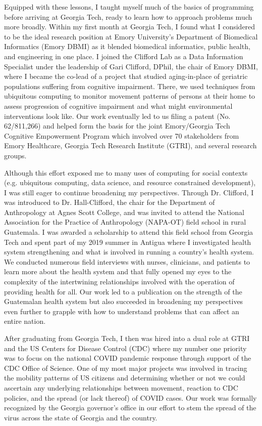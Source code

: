 \documentclass[11pt]{extarticle}
\begin{document}
Equipped with these lessons, I taught myself much of the basics of programming before arriving at Georgia Tech, ready to learn how to approach problems much more broadly.
Within my first month at Georgia Tech, I found what I considered to be the ideal research position at Emory University's Department of Biomedical Informatics (Emory DBMI) as it blended biomedical informatics, public health, and engineering in one place.
I joined the Clifford Lab as a Data Information Specialist under the leadership of Gari Clifford, DPhil, the chair of Emory DBMI,  where I became the co-lead of a project that studied aging-in-place of geriatric populations suffering from cognitive impairment.
There, we used techniques from ubiquitous computing to monitor movement patterns of persons at their home to assess progression of cognitive impairment and what might environmental interventions look like.
Our work eventually led to us filing a patent (No. 62/811,266) and helped form the basis for the joint Emory/Georgia Tech Cognitive Empowerment Program which involved over 70 stakeholders from Emory Healthcare, Georgia Tech Research Institute (GTRI), and several research groups.

Although this effort exposed me to many uses of computing for social contexts (e.g. ubiquitous computing, data science, and resource constrained development), I was still eager to continue broadening my perspectives.
Through Dr. Clifford, I was introduced to Dr. Hall-Clifford, the chair for the Department of Anthropology at Agnes Scott College, and was invited to attend the National Association for the Practice of Anthropology (NAPA-OT) field school in rural Guatemala.
I was awarded a scholarship to attend this field school from Georgia Tech and spent part of my 2019 summer in Antigua where I investigated health system strengthening and what is involved in running a country's health system.
We conducted numerous field interviews with nurses, clinicians, and patients to learn more about the health system and that fully opened my eyes to the complexity of the intertwining relationships involved with the operation of providing health for all.
Our work led to a publication on the strength of the Guatemalan health system but also succeeded in broadening my perspectives even further to grapple with how to understand problems that can affect an entire nation.

After graduating from Georgia Tech, I then was hired into a dual role at GTRI and the US Centers for Disease Control (CDC) where my number one priority was to focus on the national COVID pandemic response through support of the CDC Office of Science.
One of my most major projects was involved in tracing the mobility patterns of US citizens and determining whether or not we could ascertain any underlying relationships between movement, reaction to CDC policies, and the spread (or lack thereof) of COVID cases.
Our work was formally recognized by the Georgia governor's office in our effort to stem the spread of the virus across the state of Georgia and the country.
\end{document}
